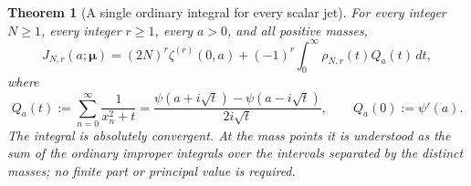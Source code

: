 \documentclass[11pt,letterpaper]{article}
\numberwithin{equation}{section}
\newtheorem{theorem}{Theorem}[section]
\theoremstyle{definition}
\theoremstyle{remark}
\begin{document}
\begin{theorem}[A single ordinary integral for every scalar jet]
\label{sp:master}
For every integer $N\geq1$, every integer $r\geq1$, every $a>0$,
and all positive masses,
\begin{equation}
 \boxed{\displaystyle
 J_{N,r}(a;\boldsymbol\mu)
 =(2N)^r\zeta^{(r)}(0,a)
       +(-1)^r\int_0^{\infty}\rho_{N,r}(t)Q_a(t)\,dt,}
 \label{sp:master-formula}
\end{equation}
where
\begin{equation}
 Q_a(t):=\sum_{n=0}^{\infty}\frac{1}{x_n^2+t}
 =\frac{\psi(a+i\sqrt t)-\psi(a-i\sqrt t)}{2i\sqrt t},
 \qquad Q_a(0):=\psi'(a).
 \label{sp:resolvent-kernel}
\end{equation}
The integral is absolutely convergent.  At the mass points it is
understood as the sum of the ordinary improper integrals over the
intervals separated by the distinct masses; no finite part or
principal value is required.
\end{theorem}
\end{document}
